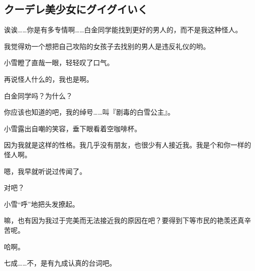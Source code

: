 \subsection{クーデレ美少女にグイグイいく}

诶诶……你是有多专情啊……白金同学能找到更好的男人的，而不是我这种怪人。

我觉得劝一个想把自己攻陷的女孩子去找别的男人是违反礼仪的哟。

小雪瞪了直哉一眼，轻轻叹了口气。

再说怪人什么的，我也是啊。

白金同学吗？为什么？

你应该也知道的吧，我的绰号……叫『剧毒的白雪公主』。

小雪露出自嘲的笑容，垂下眼看着空咖啡杯。

因为我就是这样的性格。我几乎没有朋友，也很少有人接近我。我是个和你一样的怪人啊。

嗯，我早就听说过传闻了。

对吧？

小雪“呼”地把头发撩起。

嘛，也有因为我过于完美而无法接近我的原因在吧？要得到下等市民的艳羡还真辛苦呢。

哈啊。

七成……不，是有九成认真的台词吧。

